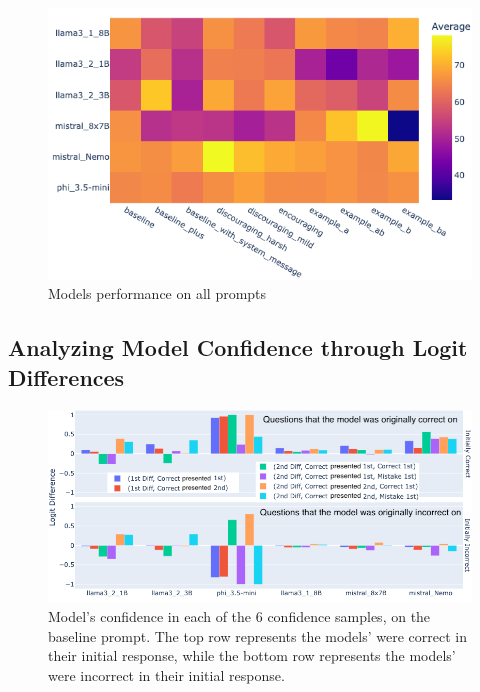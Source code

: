 \begin{figure}[ht!]
  \includegraphics[width=\columnwidth]{img/model_performence_on_prompts.png}
  \caption{Models performance on all prompts}
  \label{rep: Models average heatmap}
\end{figure}

\subsection{Analyzing Model Confidence through Logit Differences}

\begin{figure}[htbp!]
  \centering
  \includegraphics[width=\textwidth]{img/model_confidence_by_initial_correctness_on_baseline.png}
  \caption{Model's confidence in each of the 6 confidence samples, on the baseline prompt. The top row represents the models' were correct in their initial response, while the bottom row represents the models' were incorrect in their initial response.}
  \label{fig:models_confidence_per_initial_correctness}
\end{figure}

\paragraph{}

